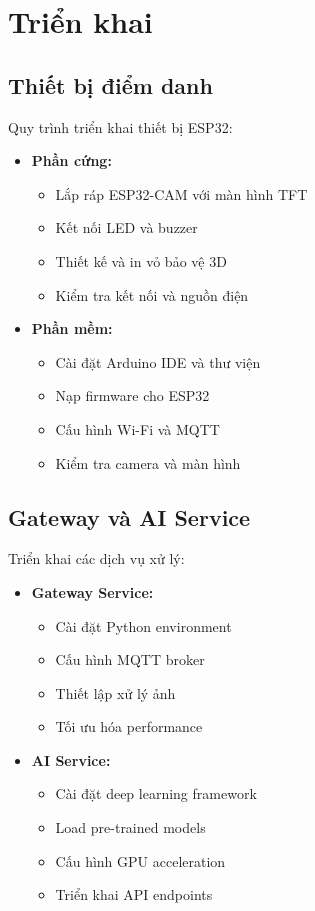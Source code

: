 \section{Triển khai}

\subsection{Thiết bị điểm danh}
\hspace{0.5cm}Quy trình triển khai thiết bị ESP32:

\begin{itemize}
    \item \textbf{Phần cứng:}
    \begin{itemize}
        \item Lắp ráp ESP32-CAM với màn hình TFT
        \item Kết nối LED và buzzer
        \item Thiết kế và in vỏ bảo vệ 3D
        \item Kiểm tra kết nối và nguồn điện
    \end{itemize}
    
    \item \textbf{Phần mềm:}
    \begin{itemize}
        \item Cài đặt Arduino IDE và thư viện
        \item Nạp firmware cho ESP32
        \item Cấu hình Wi-Fi và MQTT
        \item Kiểm tra camera và màn hình
    \end{itemize}
\end{itemize}

\subsection{Gateway và AI Service}
\hspace{0.5cm}Triển khai các dịch vụ xử lý:

\begin{itemize}
    \item \textbf{Gateway Service:}
    \begin{itemize}
        \item Cài đặt Python environment
        \item Cấu hình MQTT broker
        \item Thiết lập xử lý ảnh
        \item Tối ưu hóa performance
    \end{itemize}
    
    \item \textbf{AI Service:}
    \begin{itemize}
        \item Cài đặt deep learning framework
        \item Load pre-trained models
        \item Cấu hình GPU acceleration
        \item Triển khai API endpoints
    \end{itemize}
\end{itemize}

